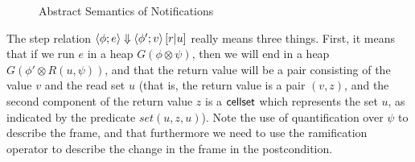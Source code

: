 \documentclass[preprint,natbib]{sigplanconf}
\begin{document}
\begin{figure}
{\small
{}
}
\caption{Abstract Semantics of Notifications}
\label{abs-semantics}
\end{figure}



The step relation $\left<{\phi};{e}\right>\Downarrow\left<{\phi'};{v}\right>\left[{r}|{u}\right]$ really means three
things. First, it means that if we run $e$ in a heap $G(\phi \otimes
\psi)$, then we will end in a heap $G(\phi' \otimes R(u, \psi))$, and
that the return value will be a pair consisting of the value $v$ and
the read set $u$ (that is, the return value is a pair $(v,z)$, and the
second component of the return value $z$ is a $\mbox{\textsf{{cellset}}}$ which
represents the set $u$, as indicated by the predicate $set(u, z, u)$).
Note the use of quantification over $\psi$ to describe the frame, and
that furthermore we need to use the ramification operator to describe
the change in the frame in the postcondition. 
\end{document}
